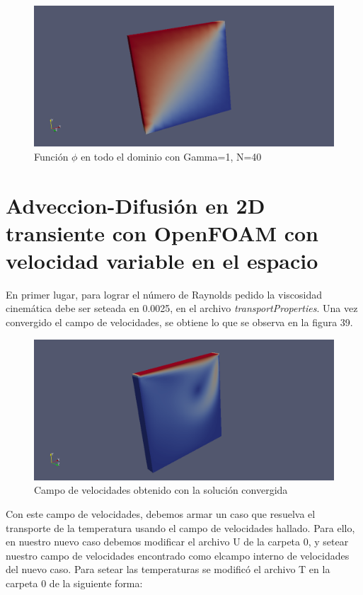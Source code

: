 \documentclass[11pt]{article}
\begin{document}
\begin{figure}[tbh]
	\centering
		\includegraphics[width=1.0\textwidth]{imagen38.png}
	\caption{Funci\'on $\phi$ en todo el dominio con Gamma=1, N=40}
	\label{fig:Fig1}
\end{figure}

\section{Adveccion-Difusi\'on en 2D transiente con OpenFOAM con velocidad variable en el espacio}

En primer lugar, para lograr el n\'umero de Raynolds pedido la viscosidad cinem\'atica debe ser seteada en 0.0025, en el archivo \textit{transportProperties}. Una vez convergido el campo de velocidades, se obtiene lo que se observa en la figura 39.

\begin{figure}[tbh]
	\centering
		\includegraphics[width=1.0\textwidth]{imagen39.png}
	\caption{Campo de velocidades obtenido con la soluci\'on convergida}
	\label{fig:Fig1}
\end{figure}

\bigskip Con este campo de velocidades, debemos armar un caso que resuelva el transporte de la temperatura usando el campo de velocidades hallado. Para ello, en nuestro nuevo caso debemos modificar el archivo U de la carpeta 0, y setear nuestro campo de velocidades encontrado como elcampo interno de velocidades del nuevo caso. Para setear las temperaturas se modific\'o el archivo T en la carpeta 0 de la siguiente forma:
\end{document}

